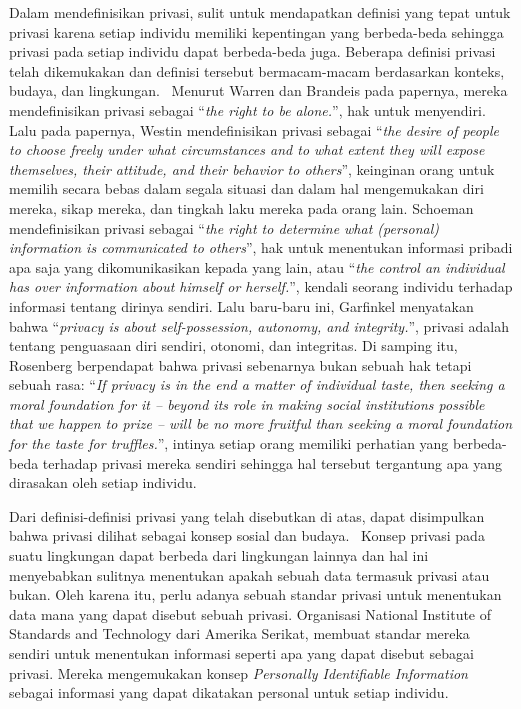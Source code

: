 Dalam mendefinisikan privasi, sulit untuk mendapatkan definisi yang tepat untuk privasi karena setiap individu memiliki kepentingan yang berbeda-beda sehingga privasi pada setiap individu dapat berbeda-beda juga. Beberapa definisi privasi telah dikemukakan dan definisi tersebut bermacam-macam berdasarkan konteks, budaya, dan lingkungan.~\cite{stanleyosmar:04:standardppdm} Menurut Warren dan Brandeis pada papernya, mereka mendefinisikan privasi sebagai “\textit{the right to be alone.}”, hak untuk menyendiri. Lalu pada papernya, Westin mendefinisikan privasi sebagai “\textit{the desire of people to choose freely under what circumstances and to what extent they will expose themselves, their attitude, and their behavior to others}”, keinginan orang untuk memilih secara bebas dalam segala situasi dan dalam hal mengemukakan diri mereka, sikap mereka, dan tingkah laku mereka pada orang lain. Schoeman mendefinisikan privasi sebagai “\textit{the right to determine what (personal) information is communicated to others}”, hak untuk menentukan informasi pribadi apa saja yang dikomunikasikan kepada yang lain, atau “\textit{the control an individual has over information about himself or herself.}”, kendali seorang individu terhadap informasi tentang dirinya sendiri. Lalu baru-baru ini, Garfinkel menyatakan bahwa “\textit{privacy is about self-possession, autonomy, and integrity.}”, privasi adalah tentang penguasaan diri sendiri, otonomi, dan integritas. Di samping itu, Rosenberg berpendapat bahwa privasi sebenarnya bukan sebuah hak tetapi sebuah rasa: “\textit{If privacy is in the end a matter of individual taste, then seeking a moral foundation for it -- beyond its role in making social institutions possible that we happen to prize -- will be no more fruitful than seeking a moral foundation for the taste for truffles.}”, intinya setiap orang memiliki perhatian yang berbeda-beda terhadap privasi mereka sendiri sehingga hal tersebut tergantung apa yang dirasakan oleh setiap individu.

Dari definisi-definisi privasi yang telah disebutkan di atas, dapat disimpulkan bahwa privasi dilihat sebagai konsep sosial dan budaya.~\cite{stanleyosmar:04:standardppdm} Konsep privasi pada suatu lingkungan dapat berbeda dari lingkungan lainnya dan hal ini menyebabkan sulitnya menentukan apakah sebuah data termasuk privasi atau bukan. Oleh karena itu, perlu adanya sebuah standar privasi untuk menentukan data mana yang dapat disebut sebuah privasi. Organisasi National Institute of Standards and Technology dari Amerika Serikat, membuat standar mereka sendiri untuk menentukan informasi seperti apa yang dapat disebut sebagai privasi. Mereka mengemukakan konsep \textit{Personally Identifiable Information} sebagai informasi yang dapat dikatakan personal untuk setiap individu.

